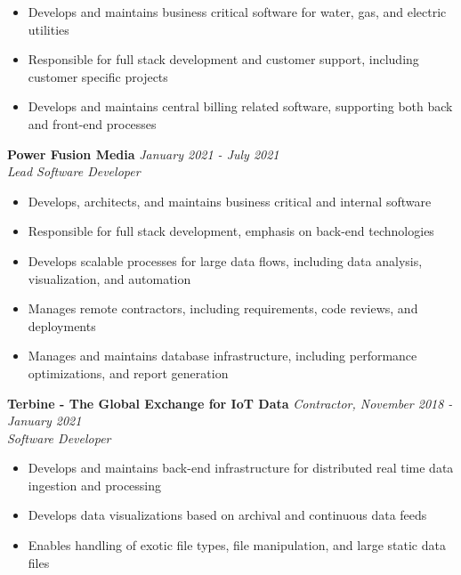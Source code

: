 \documentclass{res}
\begin{document}
\begin{resume}
			\begin{itemize} \itemsep -2pt
				\item Develops and maintains business critical software for water, gas, and electric utilities
				\item Responsible for full stack development and customer support, including customer specific projects
				\item Develops and maintains central billing related software, supporting both back and front-end processes
			\end{itemize} \vspace{-2mm}
			
	    {\bf Power Fusion Media} \hfill \emph{January 2021 - July 2021} \\
			\emph{Lead Software Developer}

			\begin{itemize} \itemsep -2pt
				\item Develops, architects, and maintains business critical and internal software
				\item Responsible for full stack development, emphasis on back-end technologies
				\item Develops scalable processes for large data flows, including data analysis, visualization, and automation
				\item Manages remote contractors, including requirements, code reviews, and deployments
                \item Manages and maintains database infrastructure, including performance optimizations, and report generation
			\end{itemize} \vspace{-2mm}
    
		{\bf Terbine - The Global Exchange for IoT Data} \hfill \emph{Contractor, November 2018 - January 2021} \\
			\emph{Software Developer}

			\begin{itemize} \itemsep -2pt
				\item Develops and maintains back-end infrastructure for distributed real time data ingestion and processing
				\item Develops data visualizations based on archival and continuous data feeds
				\item Enables handling of exotic file types, file manipulation, and large static data files
			\end{itemize} \vspace{-2mm}


\end{resume}
\end{document}
